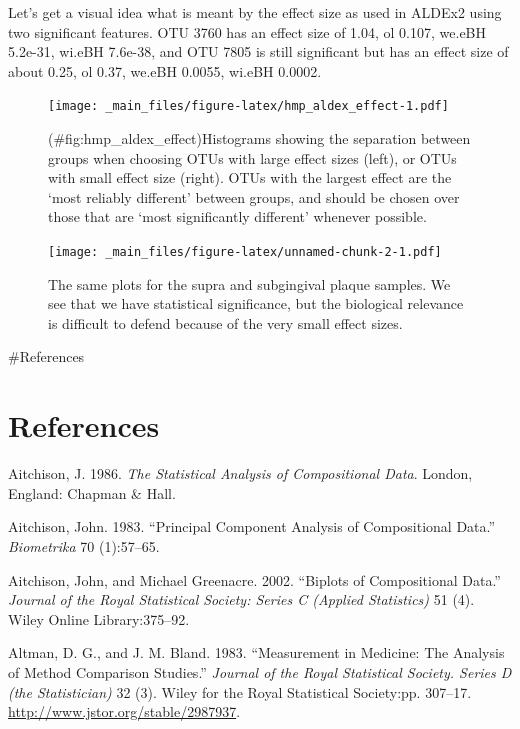 \documentclass[onecolumn]{book}
\theoremstyle{definition}
\theoremstyle{definition}
\theoremstyle{definition}
\theoremstyle{remark}
\begin{document}
Let's get a visual idea what is meant by the effect size as used in
ALDEx2 using two significant features. OTU 3760 has an effect size of
1.04, ol 0.107, we.eBH 5.2e-31, wi.eBH 7.6e-38, and OTU 7805 is still
significant but has an effect size of about 0.25, ol 0.37, we.eBH
0.0055, wi.eBH 0.0002.

\begin{figure}
\centering
\texttt{[image: \_main\_files/figure-latex/hmp\_aldex\_effect-1.pdf]}
\caption{(\#fig:hmp\_aldex\_effect)Histograms showing the separation
between groups when choosing OTUs with large effect sizes (left), or
OTUs with small effect size (right). OTUs with the largest effect are
the `most reliably different' between groups, and should be chosen over
those that are `most significantly different' whenever possible.}
\end{figure}

\newpage

\begin{figure}
\centering
\texttt{[image: \_main\_files/figure-latex/unnamed-chunk-2-1.pdf]}
\caption{\label{fig:unnamed-chunk-2}The same plots for the supra and
subgingival plaque samples. We see that we have statistical
significance, but the biological relevance is difficult to defend
because of the very small effect sizes.}
\end{figure}

\newpage

\#References

\hypertarget{references}{%
\chapter{References}\label{references}}

\hypertarget{refs}{}
\leavevmode\hypertarget{ref-Aitchison:1986}{}%
Aitchison, J. 1986. \emph{The Statistical Analysis of Compositional
Data}. London, England: Chapman \& Hall.

\leavevmode\hypertarget{ref-Ait1983}{}%
Aitchison, John. 1983. ``Principal Component Analysis of Compositional
Data.'' \emph{Biometrika} 70 (1):57--65.

\leavevmode\hypertarget{ref-aitchison2002biplots}{}%
Aitchison, John, and Michael Greenacre. 2002. ``Biplots of Compositional
Data.'' \emph{Journal of the Royal Statistical Society: Series C
(Applied Statistics)} 51 (4). Wiley Online Library:375--92.

\leavevmode\hypertarget{ref-altman:1983}{}%
Altman, D. G., and J. M. Bland. 1983. ``Measurement in Medicine: The
Analysis of Method Comparison Studies.'' \emph{Journal of the Royal
Statistical Society. Series D (the Statistician)} 32 (3). Wiley for the
Royal Statistical Society:pp. 307--17.
\url{http://www.jstor.org/stable/2987937}.
\end{document}

